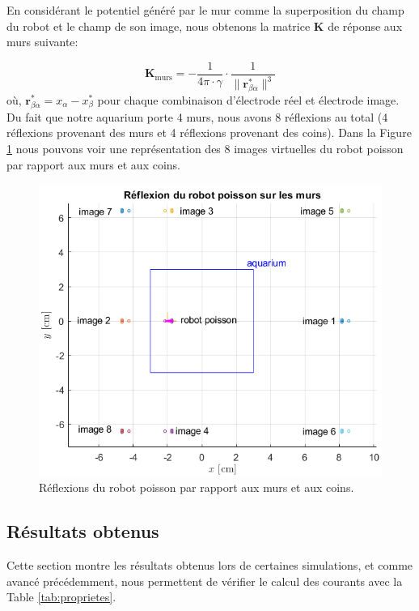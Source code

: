 En considérant le potentiel généré par le mur comme la superposition du champ du robot et le champ de son image, nous obtenons la matrice $\mathbf{K}$ de réponse aux murs suivante: 

\begin{equation}
    \mathbf{K}_{\text{murs}} = - \frac{1}{4\pi \cdot \gamma} \cdot \frac{1}{\lVert \mathbf{r}_{\beta\alpha}^* \rVert^3}
\end{equation}
où, $\mathbf{r}_{\beta\alpha}^* = x_\alpha - x_\beta^*$ pour chaque combinaison d'électrode réel et électrode image. Du fait que notre aquarium porte 4 murs, nous avons 8 réflexions au total (4 réflexions provenant des murs et 4 réflexions provenant des coins). Dans la Figure \ref{fig:wall_reflexion} nous pouvons voir une représentation des 8 images virtuelles du robot poisson par rapport aux murs et aux coins. 

\begin{figure}
    \centering
    \includegraphics[scale=0.8]{assets/wall_reflexions/wall_reflexion.png}
    \caption{\centering Réflexions du robot poisson par rapport aux murs et aux coins.}
    \label{fig:wall_reflexion}
\end{figure}
\clearpage

\subsection{Résultats obtenus} \label{sec:resultats}
Cette section montre les résultats obtenus lors de certaines simulations, et comme avancé précédemment, nous permettent de vérifier le calcul des courants avec la Table \ref{tab:proprietes}. 

